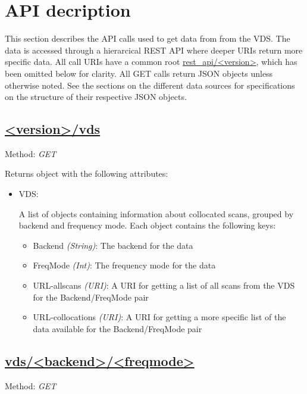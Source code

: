 \section{API decription}
\label{sec:api}
This section describes the API calls used to get data from from the VDS.  The
data is accessed through a hierarcical REST API where deeper URIs return more
specific data.  All call URIs have a common root \url{rest_api/<version>}, which
has been omitted below for clarity.  All GET calls return JSON objects unless
otherwise noted. See the sections on the different data sources for
specifications on the structure of their respective JSON objects.


\subsection{\url{<version>/vds}}
Method: \emph{GET}

Returns object with the following attributes:
\begin{itemize}
    \item VDS:

        A list of objects containing information about collocated scans,
        grouped by backend and frequency mode.
        Each object contains the following keys:

        \begin{itemize}
            \item Backend \emph{(String)}: The backend for the data
            \item FreqMode \emph{(Int)}: The frequency mode for the data
            \item URL-allscans \emph{(URI)}: A URI for getting a list of all
                scans from the VDS for the Backend/FreqMode pair
            \item URL-collocations \emph{(URI)}: A URI for getting a more
                specific list of the data available for the Backend/FreqMode
                pair
        \end{itemize}
\end{itemize}


\subsection{\url{vds/<backend>/<freqmode>}}
Method: \emph{GET}

